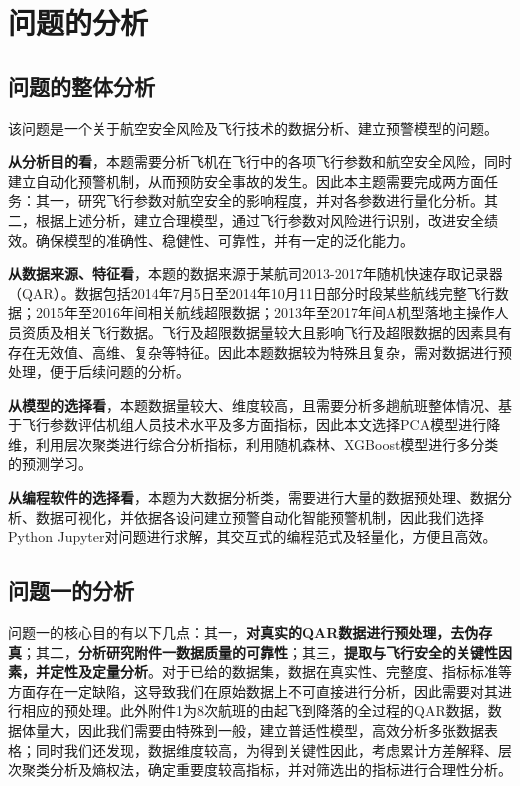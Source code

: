 \documentclass{MathorCupModeling}
\begin{document}
	\section{问题的分析}
	\subsection{问题的整体分析}
	该问题是一个关于航空安全风险及飞行技术的数据分析、建立预警模型的问题。
	
	\textbf{从分析目的看}，本题需要分析飞机在飞行中的各项飞行参数和航空安全风险，同时建立自动化预警机制，从而预防安全事故的发生。因此本主题需要完成两方面任务：其一，研究飞行参数对航空安全的影响程度，并对各参数进行量化分析。其二，根据上述分析，建立合理模型，通过飞行参数对风险进行识别，改进安全绩效。确保模型的准确性、稳健性、可靠性，并有一定的泛化能力。

	\textbf{从数据来源、特征看}，本题的数据来源于某航司2013-2017年随机快速存取记录器（QAR）。数据包括2014年7月5日至2014年10月11日部分时段某些航线完整飞行数据；2015年至2016年间相关航线超限数据；2013年至2017年间A机型落地主操作人员资质及相关飞行数据。飞行及超限数据量较大且影响飞行及超限数据的因素具有存在无效值、高维、复杂等特征。因此本题数据较为特殊且复杂，需对数据进行预处理，便于后续问题的分析。
	
	\textbf{从模型的选择看}，本题数据量较大、维度较高，且需要分析多趟航班整体情况、基于飞行参数评估机组人员技术水平及多方面指标，因此本文选择PCA模型进行降维，利用层次聚类进行综合分析指标，利用随机森林、XGBoost模型进行多分类的预测学习。

	\textbf{从编程软件的选择看}，本题为大数据分析类，需要进行大量的数据预处理、数据分析、数据可视化，并依据各设问建立预警自动化智能预警机制，因此我们选择Python Jupyter对问题进行求解，其交互式的编程范式及轻量化，方便且高效。
	
	\subsection{问题一的分析}
	问题一的核心目的有以下几点：{\heiti 其一}，\textbf{对真实的QAR数据进行预处理，去伪存真}；{\heiti 其二}，\textbf{分析研究附件一数据质量的可靠性}；{\heiti 其三}，\textbf{提取与飞行安全的关键性因素，并定性及定量分析}。对于已给的数据集，数据在真实性、完整度、指标标准等方面存在一定缺陷，这导致我们在原始数据上不可直接进行分析，因此需要对其进行相应的预处理。此外附件1为8次航班的由起飞到降落的全过程的QAR数据，数据体量大，因此我们需要由特殊到一般，建立普适性模型，高效分析多张数据表格；同时我们还发现，数据维度较高，为得到关键性因此，考虑累计方差解释、层次聚类分析及熵权法，确定重要度较高指标，并对筛选出的指标进行合理性分析。
\end{document}
